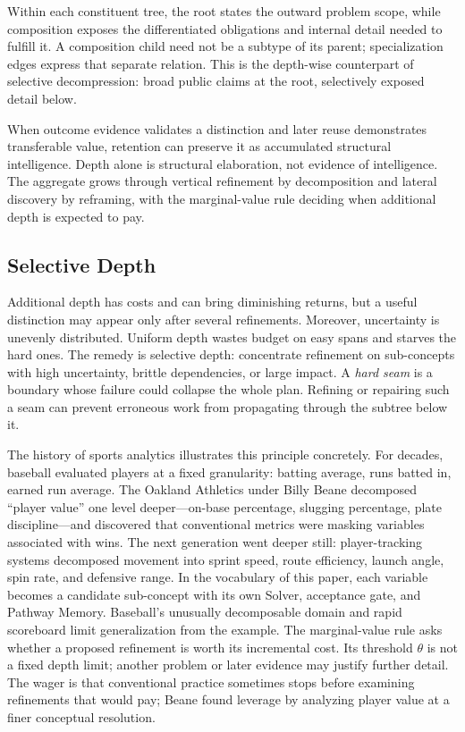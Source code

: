 \documentclass[11pt]{article}
\begin{document}
Within each constituent tree, the root states the outward problem scope, while composition exposes the differentiated obligations and internal detail needed to fulfill it. A composition child need not be a subtype of its parent; specialization edges express that separate relation. This is the depth-wise counterpart of selective decompression: broad public claims at the root, selectively exposed detail below.

When outcome evidence validates a distinction and later reuse demonstrates transferable value, retention can preserve it as accumulated structural intelligence. Depth alone is structural elaboration, not evidence of intelligence. The aggregate grows through vertical refinement by decomposition and lateral discovery by reframing, with the marginal-value rule deciding when additional depth is expected to pay.


\subsection{Selective Depth}
\label{sec:selective-depth}

Additional depth has costs and can bring diminishing returns, but a useful distinction may appear only after several refinements. Moreover, uncertainty is unevenly distributed. Uniform depth wastes budget on easy spans and starves the hard ones. The remedy is selective depth: concentrate refinement on sub-concepts with high uncertainty, brittle dependencies, or large impact. A \emph{hard seam} is a boundary whose failure could collapse the whole plan. Refining or repairing such a seam can prevent erroneous work from propagating through the subtree below it.

The history of sports analytics illustrates this principle concretely. For decades, baseball evaluated players at a fixed granularity: batting average, runs batted in, earned run average. The Oakland Athletics under Billy Beane decomposed ``player value'' one level deeper---on-base percentage, slugging percentage, plate discipline---and discovered that conventional metrics were masking variables associated with wins. The next generation went deeper still: player-tracking systems decomposed movement into sprint speed, route efficiency, launch angle, spin rate, and defensive range. In the vocabulary of this paper, each variable becomes a candidate sub-concept with its own Solver, acceptance gate, and Pathway Memory. Baseball's unusually decomposable domain and rapid scoreboard limit generalization from the example. The marginal-value rule asks whether a proposed refinement is worth its incremental cost. Its threshold $\theta$ is not a fixed depth limit; another problem or later evidence may justify further detail. The wager is that conventional practice sometimes stops before examining refinements that would pay; Beane found leverage by analyzing player value at a finer conceptual resolution.
\end{document}
